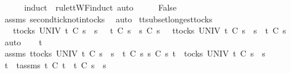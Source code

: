 \begin{isabellebody}
\ \ \ \ \isamarkupfalse%
\ {\isacharparenleft}induct\ {\isasymrho}\ rule{\isacharcolon}ttWF{\isachardot}induct{\isacharcomma}\ auto{\isacharparenright}\isanewline
\ \ \isamarkupfalse%
\ \isamarkupfalse%
\ False\isanewline
\ \ \ \ \isamarkupfalse%
\ assms{\isacharparenleft}{}{\isacharparenright}\ second{\isacharunderscore}tick{\isacharunderscore}notin{\isacharunderscore}tocks\ \isamarkupfalse%
\ auto\isanewline
{}\isamarkupfalse%
%
\endisatagproof
{\isafoldproof}%
%
\isadelimproof
\isanewline
%
\endisadelimproof
\isanewline
{}\isamarkupfalse%
\ tt{\isacharunderscore}subset{\isacharunderscore}longest{\isacharunderscore}tocks{}{\isacharcolon}\isanewline
\ \ {\isachardoublequoteopen}{\isasymforall}\ t{\isasymin}tocks\ UNIV{\isachardot}\ t\ {\isasymle}\isactrlsub C\ s{}\ {\isacharat}\ s{}\ \ {\isasymlongrightarrow}\ t\ {\isasymle}\isactrlsub C\ s{}\ {\isasymLongrightarrow}\ s{}{\isacharprime}\ {\isasymsubseteq}\isactrlsub C\ s{}\ {\isasymLongrightarrow}\ {\isasymforall}\ t{\isasymin}tocks\ UNIV{\isachardot}\ t\ {\isasymle}\isactrlsub C\ s{}\ {\isacharat}\ s{}{\isacharprime}\ {\isasymlongrightarrow}\ t\ {\isasymle}\isactrlsub C\ s{}{\isachardoublequoteclose}\isanewline
%
\isadelimproof
%
\endisadelimproof
%
\isatagproof
{}\isamarkupfalse%
\ auto\isanewline
\ \ \isamarkupfalse%
\ t\isanewline
\ \ \isamarkupfalse%
\ assms{\isacharcolon}\ {\isachardoublequoteopen}{\isasymforall}t{\isasymin}tocks\ UNIV{\isachardot}\ t\ {\isasymle}\isactrlsub C\ s{}\ {\isacharat}\ s{}\ {\isasymlongrightarrow}\ t\ {\isasymle}\isactrlsub C\ s{}{\isachardoublequoteclose}\ {\isachardoublequoteopen}s{}{\isacharprime}\ {\isasymsubseteq}\isactrlsub C\ s{}{\isachardoublequoteclose}\ {\isachardoublequoteopen}t\ {\isasymin}\ tocks\ UNIV{\isachardoublequoteclose}\ {\isachardoublequoteopen}t\ {\isasymle}\isactrlsub C\ s{}\ {\isacharat}\ s{}{\isacharprime}{\isachardoublequoteclose}\isanewline
\ \ \isamarkupfalse%
\ \isamarkupfalse%
\ t{\isacharprime}\ \ t{\isacharprime}{\isacharunderscore}assms{\isacharcolon}\ {\isachardoublequoteopen}t\ {\isasymsubseteq}\isactrlsub C\ t{\isacharprime}\ {\isasymand}\ t{\isacharprime}\ {\isasymle}\isactrlsub C\ s{}\ {\isacharat}\ s{}{\isachardoublequoteclose}\isanewline

\end{isabellebody}
